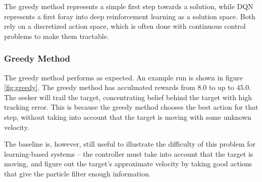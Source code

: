\documentclass[10pt,twocolumn,letterpaper]{article}
\begin{document}
The greedy method represents a simple first step towards a solution, while DQN represents a first foray into deep reinforcement learning as a solution space.
Both rely on a discretized action space, which is often done with continuous control problems to make them tractable.

\subsubsection{Greedy Method}
The greedy method performs as expected.
An example run is shown in figure \ref{fig:greedy}.
The greedy method has acculmated rewards from $8.0$ to up to $45.0$.
The seeker will trail the target, concentrating belief behind the target with high tracking error.
This is because the greedy method chooses the best action for that step, without taking into account that the target is moving with some unknown velocity.

The baseline is, however, still useful to illustrate the difficulty of this problem for learning-based systems -- the controller must take into account that the target is moving, and figure out the target's approximate velocity by taking good actions that give the particle filter enough information.
\end{document}
